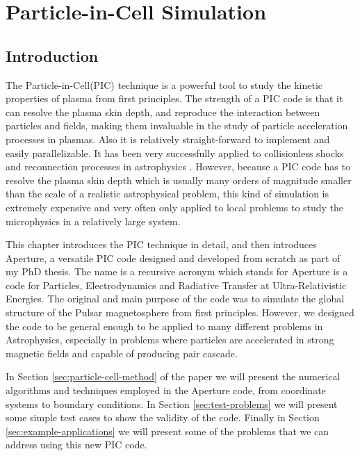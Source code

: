 
\chapter{Particle-in-Cell Simulation}
\label{chap:pic}

\section{Introduction}
\label{sec:introduction}

The Particle-in-Cell(PIC) technique is a powerful tool to study the kinetic
properties of plasma from first principles. The strength of a PIC code is that
it can resolve the plasma skin depth, and reproduce the interaction between
particles and fields, making them invaluable in the study of particle
acceleration processes in plasmas. Also it is relatively straight-forward to
implement and easily parallelizable. It has been very successfully applied to
collisionless shocks and reconnection processes in astrophysics
. However, because a PIC code has to resolve the
plasma skin depth which is usually many orders of magnitude smaller than the
scale of a realistic astrophysical problem, this kind of simulation is extremely
expensive and very often only applied to local problems to study the
microphysics in a relatively large system.

This chapter introduces the PIC technique in detail, and then introduces
Aperture, a versatile PIC code designed and developed from scratch as part of my
PhD thesis. The name is a recursive acronym which stands for Aperture is a code
for Particles, Electrodynamics and Radiative Transfer at Ultra-Relativistic
Energies. The original and main purpose of the code was to simulate the global
structure of the Pulsar magnetosphere from first principles. However, we
designed the code to be general enough to be applied to many different problems
in Astrophysics, especially in problems where particles are accelerated in
strong magnetic fields and capable of producing pair cascade.

In Section \ref{sec:particle-cell-method} of the paper we will present
the numerical algorithms and techniques employed in the Aperture code,
from coordinate systems to boundary conditions. In Section
\ref{sec:test-problems} we will present some simple test cases to show
the validity of the code. Finally in Section
\ref{sec:example-applications} we will present some of the problems
that we can address using this new PIC code.

